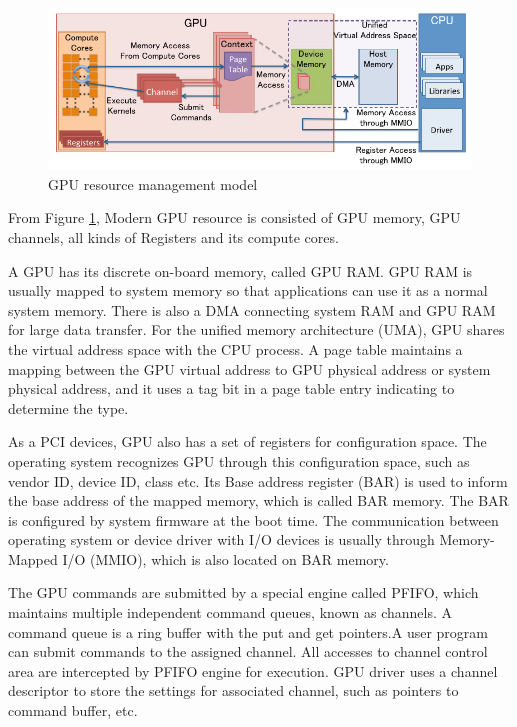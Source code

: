 \documentclass[a4paper,12pt]{article}
\begin{document}
\begin{figure}
\centering
  \includegraphics[width=\linewidth]{gpu_management_model.png}
  \caption{GPU resource management model}
  \label{fig:gpuarch}
\end{figure}

From Figure \ref{fig:gpuarch}, Modern GPU resource is consisted of GPU memory, GPU channels, all kinds of Registers and its compute cores.

A GPU has its discrete on-board memory, called GPU RAM. GPU RAM is usually mapped to system memory so that applications can use it as a normal system memory. There is also a DMA connecting system RAM and GPU RAM for large data transfer. For the unified memory architecture (UMA), GPU shares the virtual address space with the CPU process. A page table maintains a mapping between the GPU virtual address to GPU physical address or system physical address, and it uses a tag bit in a page table entry indicating to determine the type.

As a PCI devices, GPU also has a set of registers for configuration space. The operating system recognizes GPU through this configuration space, such as vendor ID, device ID, class etc. Its Base address register (BAR) is used to inform the base address of the mapped memory, which is called BAR memory. The BAR is configured by system firmware at the boot time. The communication between operating system or device driver with I/O devices is usually through Memory-Mapped I/O (MMIO), which is also located on BAR memory. 

The GPU commands are submitted by a special engine called PFIFO, which maintains multiple independent command queues, known as channels. A command queue is a ring buffer with the put and get pointers.A user program can submit commands to the assigned channel. All accesses to channel control area are intercepted by PFIFO engine for execution. GPU driver uses a channel descriptor to store the settings for associated channel, such as
pointers to command buffer, etc.
\end{document}

